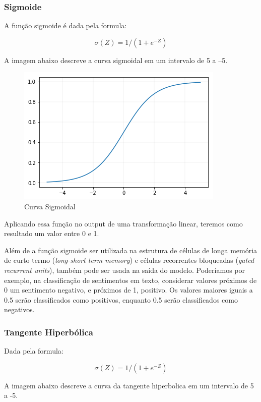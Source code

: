 \documentclass[12pt]{article}
\begin{document}
\subsubsection{Sigmoide}

A função sigmoide é dada pela formula:

\begin{equation}
    \sigma(Z) = 1/(1+e^{-Z})
\end{equation}

A imagem abaixo descreve a curva sigmoidal em um intervalo de 5 a –5.

\begin{figure}[!htb]
\centering
\includegraphics[width=.5\textwidth]{images/sigmoid.png}
\caption{Curva Sigmoidal}
\label{fig:sigmoid}
\end{figure}

Aplicando essa função no output de uma transformação linear, teremos como resultado um valor entre 0 e 1.

Além de a função sigmoide ser utilizada na estrutura de células de longa memória de curto termo (\textit{long-short term memory}) e células recorrentes bloqueadas (\textit{gated recurrent units}), também pode ser usada na saída do modelo. Poderíamos por exemplo, na classificação de sentimentos em texto, considerar valores próximos de 0 um sentimento negativo, e próximos de 1, positivo. Os valores maiores iguais a 0.5 serão classificados como positivos, enquanto 0.5 serão classificados como negativos.

\subsubsection{Tangente Hiperbólica}

Dada pela formula: 

\begin{equation}
    \sigma(Z) = 1/(1+e^{-Z})
\end{equation}

A imagem abaixo descreve a curva da tangente hiperbolica em um intervalo de 5 a -5.
\end{document}
